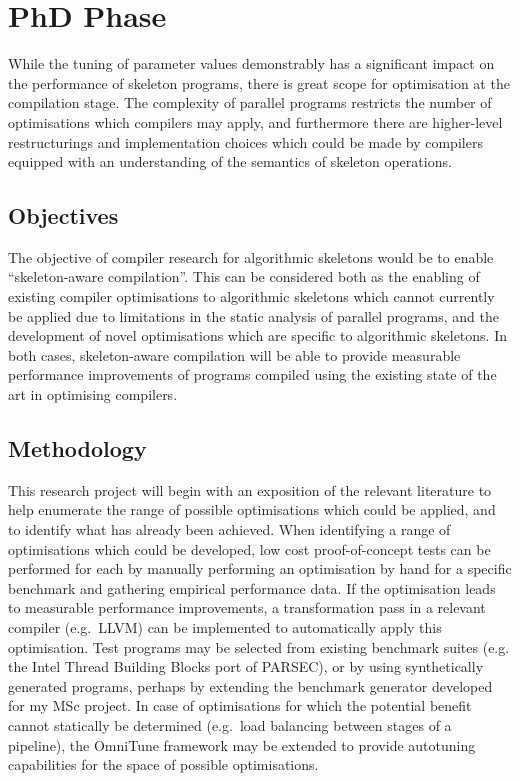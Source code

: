 \documentclass[11pt]{article}
\begin{document}
%


\section{%
PhD Phase}

While the tuning of parameter values demonstrably has a significant
impact on the performance of skeleton programs, there is great scope
for optimisation at the compilation stage. The complexity of parallel
programs restricts the number of optimisations which compilers may
apply, and furthermore there are higher-level restructurings and
implementation choices which could be made by compilers equipped with
an understanding of the semantics of skeleton operations.

\subsection{Objectives}

The objective of compiler research for algorithmic skeletons would be
to enable ``skeleton-aware compilation''. This can be considered both
as the enabling of existing compiler optimisations to algorithmic
skeletons which cannot currently be applied due to limitations in the
static analysis of parallel programs, and the development of novel
optimisations which are specific to algorithmic skeletons. In both
cases, skeleton-aware compilation will be able to provide measurable
performance improvements of programs compiled using the existing state
of the art in optimising compilers.


\subsection{Methodology}

This research project will begin with an exposition of the relevant
literature to help enumerate the range of possible optimisations which
could be applied, and to identify what has already been achieved.
When identifying a range of optimisations which could be developed,
low cost proof-of-concept tests can be performed for each by manually
performing an optimisation by hand for a specific benchmark and
gathering empirical performance data. If the optimisation leads to
measurable performance improvements, a transformation pass in a
relevant compiler (e.g.\ LLVM) can be implemented to automatically
apply this optimisation. Test programs may be selected from existing
benchmark suites (e.g. the Intel Thread Building Blocks port of
PARSEC), or by using synthetically generated programs, perhaps by
extending the benchmark generator developed for my MSc project. In
case of optimisations for which the potential benefit cannot
statically be determined (e.g.\ load balancing between stages of a
pipeline), the OmniTune framework may be extended to provide
autotuning capabilities for the space of possible optimisations.
\end{document}
